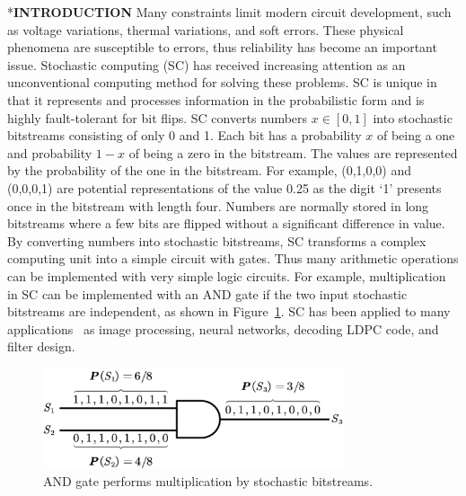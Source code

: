 \documentclass[conference,letterpaper]{IEEEtran}
\makeatletter
\renewcommand{\section}{\@startsection{section}{1}{0mm}
    {-\baselineskip}{0.001\baselineskip}{\bf\leftline}}
\makeatother
\begin{document}
\section*{\textbf{\large INTRODUCTION}}
Many constraints limit modern circuit development, such as voltage variations, thermal variations, and soft errors. These physical phenomena are susceptible to errors, thus reliability has become an important issue. Stochastic computing (SC) has received increasing attention as an unconventional computing method for solving these problems. SC is unique in that it represents and processes information in the probabilistic form and is highly fault-tolerant for bit flips. SC converts numbers $x\in[0,1]$ into stochastic bitstreams consisting of only 0 and 1. 
Each bit has a probability $x$ of being a one and probability $1-x$ of being a zero in the bitstream. The values are represented by the probability of the one in the bitstream. For example, (0,1,0,0) and (0,0,0,1) are potential representations of the value 0.25 as the digit `1' presents once in the bitstream with length four. Numbers are normally stored in long bitstreams where a few bits are flipped without a significant difference in value. By converting numbers into stochastic bitstreams, SC %
transforms a complex computing unit into a simple circuit with gates. Thus many arithmetic operations can be implemented with very simple logic circuits. For example, multiplication in SC %
 can be implemented with an AND gate if the two input stochastic bitstreams are independent, as shown in Figure~\ref{fig:sto}. 
SC has been applied to many applications~\cite{Promise-and-Challenge} as image processing, neural networks, decoding LDPC code, and filter design.
\vspace{3ex}


\begin{figure}[t]
	\centering
	\includegraphics[width=3.5in]{fig/AND3.pdf}
	\caption{\label{fig:sto}AND gate performs multiplication by stochastic bitstreams.}  \vspace{-3.5ex}
\end{figure}
\end{document}
